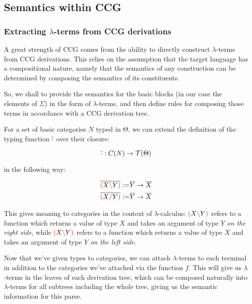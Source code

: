 \documentclass[main.tex]{subfiles}
\begin{document}
\subsection{Semantics within CCG}

\subsubsection{Extracting $\lambda$-terms from CCG derivations}

A great strength of CCG comes from the ability to directly construct $\lambda$-terms
from CCG derivations. This relies on the assumption that the target
language has a compositional nature, namely that the semantics of any construction
can be determined by composing the semantics of its constituents.

So, we shall to provide the semantics for the basic blocks (in our case
the elements of $\Sigma$) in the form of $\lambda$-terms, and then define rules
for composing those terms in accordance with a CCG derivation tree.

\begin{defn}
    For a set of basic categories $N$ typed in $\Theta$, we can extend the
    definition of the typing function $\overline{\cdot}$ over their closure:

    \[ \overline{\cdot} : C(N) \rightarrow \mathcal{T}( \Theta ) \]

    in the following way:

    \begin{align*}
        \overline{\textcolor{red}{(} X \textcolor{red}{\backslash} Y \textcolor{red}{)}} := & \overline{Y} \rightarrow \overline{X} \\
        \overline{\textcolor{red}{(} X \textcolor{red}{/} Y \textcolor{red}{)}} := & \overline{Y} \rightarrow \overline{X} \\
    \end{align*}

    This gives meaning to categories in the context of $\lambda$-calculus:
    $\textcolor{red}{(} X \textcolor{red}{\backslash} Y \textcolor{red}{)}$ refers to a function which returns a value of type
    $X$ and takes an argument of type $Y$ \emph{on the right side}, while
    $\textcolor{red}{(} X \textcolor{red}{\backslash} Y \textcolor{red}{)}$ refers to a function which returns a value of type
    $X$ and takes an argument of type $Y$ \emph{on the left side}.
\end{defn}

Now that we've given types to categories, we can attach $\lambda$-terms
to each terminal in addition to the categories we've attached via the function
$f$. This will give us $\lambda$-terms in the leaves of each derivation tree,
which can be composed naturally into $\lambda$-terms for all subtrees including
the whole tree, giving us the semantic information for this parse.
\end{document}
